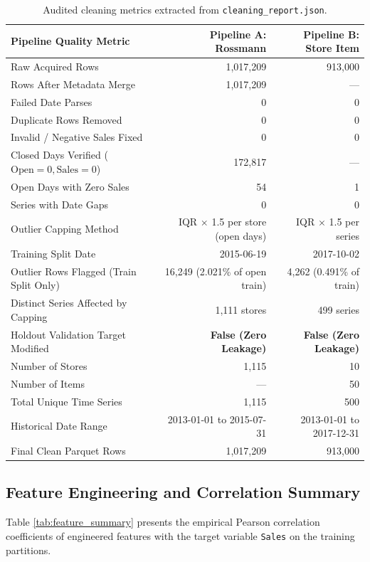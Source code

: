 \documentclass[11pt,a4paper]{article}
\begin{document}
\begin{table}[H]
    \centering
    \small
    \begin{tabular}{lrr}
        \toprule
        \textbf{Pipeline Quality Metric} & \textbf{Pipeline A: Rossmann} & \textbf{Pipeline B: Store Item} \\
        \midrule
        Raw Acquired Rows & 1,017,209 & 913,000 \\
        Rows After Metadata Merge & 1,017,209 & --- \\
        Failed Date Parses & 0 & 0 \\
        Duplicate Rows Removed & 0 & 0 \\
        Invalid / Negative Sales Fixed & 0 & 0 \\
        Closed Days Verified ($\text{Open}=0, \text{Sales}=0$) & 172,817 & --- \\
        Open Days with Zero Sales & 54 & 1 \\
        Series with Date Gaps & 0 & 0 \\
        Outlier Capping Method & IQR $\times$ 1.5 per store (open days) & IQR $\times$ 1.5 per series \\
        Training Split Date & 2015-06-19 & 2017-10-02 \\
        Outlier Rows Flagged (Train Split Only) & 16,249 (2.021\% of open train) & 4,262 (0.491\% of train) \\
        Distinct Series Affected by Capping & 1,111 stores & 499 series \\
        Holdout Validation Target Modified & \textbf{False (Zero Leakage)} & \textbf{False (Zero Leakage)} \\
        Number of Stores & 1,115 & 10 \\
        Number of Items & --- & 50 \\
        Total Unique Time Series & 1,115 & 500 \\
        Historical Date Range & 2013-01-01 to 2015-07-31 & 2013-01-01 to 2017-12-31 \\
        Final Clean Parquet Rows & 1,017,209 & 913,000 \\
        \bottomrule
    \end{tabular}
    \caption{Audited cleaning metrics extracted from \texttt{cleaning\_report.json}.}
    \label{tab:cleaning_summary}
\end{table}

\subsection{Feature Engineering and Correlation Summary}
Table \ref{tab:feature_summary} presents the empirical Pearson correlation coefficients of engineered features with the target variable \texttt{Sales} on the training partitions.
\end{document}
